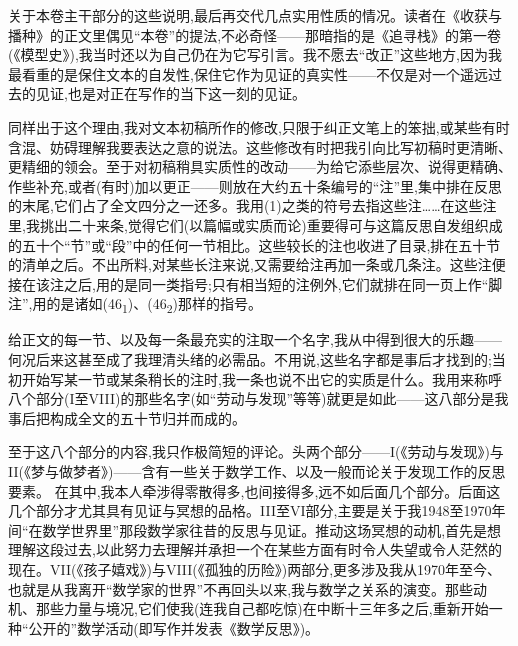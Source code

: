 关于本卷主干部分的这些说明,最后再交代几点实用性质的情况。读者在《收获与播种》的正文里偶见“本卷”的提法,不必奇怪——那暗指的是《追寻栈》的第一卷(《模型史》),我当时还以为自己仍在为它写引言。我不愿去“改正”这些地方,因为我最看重的是保住文本的自发性,保住它作为见证的真实性——不仅是对一个遥远过去的见证,也是对正在写作的当下这一刻的见证。

同样出于这个理由,我对文本初稿所作的修改,只限于纠正文笔上的笨拙,或某些有时含混、妨碍理解我要表达之意的说法。这些修改有时把我引向比写初稿时更清晰、更精细的领会。至于对初稿稍具实质性的改动——为给它添些层次、说得更精确、作些补充,或者(有时)加以更正——则放在大约五十条编号的“注”里,集中排在反思的末尾,它们占了全文四分之一还多。我用(1)之类的符号去指这些注……在这些注里,我挑出二十来条,觉得它们(以篇幅或实质而论)重要得可与这篇反思自发组织成的五十个“节”或“段”中的任何一节相比。这些较长的注也收进了目录,排在五十节的清单之后。不出所料,对某些长注来说,又需要给注再加一条或几条注。这些注便接在该注之后,用的是同一类指号;只有相当短的注例外,它们就排在同一页上作“脚注”,用的是诸如(46\textsubscript{1})、(46\textsubscript{2})那样的指号。

给正文的每一节、以及每一条最充实的注取一个名字,我从中得到很大的乐趣——何况后来这甚至成了我理清头绪的必需品。不用说,这些名字都是事后才找到的;当初开始写某一节或某条稍长的注时,我一条也说不出它的实质是什么。我用来称呼八个部分(I至VIII)的那些名字(如“劳动与发现”等等)就更是如此——这八部分是我事后把构成全文的五十节归并而成的。

至于这八个部分的内容,我只作极简短的评论。头两个部分——I(《劳动与发现》)与II(《梦与做梦者》)——含有一些关于数学工作、以及一般而论关于发现工作的反思要素。
在其中,我本人牵涉得零散得多,也间接得多,远不如后面几个部分。后面这几个部分才尤其具有见证与冥想的品格。III至VI部分,主要是关于我1948至1970年间“在数学世界里”那段数学家往昔的反思与见证。推动这场冥想的动机,首先是想理解这段过去,以此努力去理解并承担一个在某些方面有时令人失望或令人茫然的现在。VII(《孩子嬉戏》)与VIII(《孤独的历险》)两部分,更多涉及我从1970年至今、也就是从我离开“数学家的世界”不再回头以来,我与数学之关系的演变。那些动机、那些力量与境况,它们使我(连我自己都吃惊)在中断十三年多之后,重新开始一种“公开的”数学活动(即写作并发表《数学反思》)。
